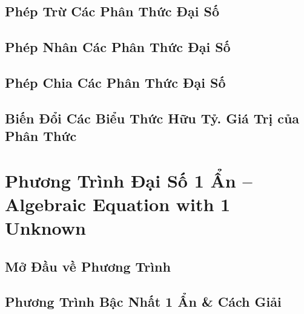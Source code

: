 \documentclass{article}
\numberwithin{equation}{section}
\begin{document}

\subsection{Phép Trừ Các Phân Thức Đại Số}


\subsection{Phép Nhân Các Phân Thức Đại Số}


\subsection{Phép Chia Các Phân Thức Đại Số}


\subsection{Biến Đổi Các Biểu Thức Hữu Tỷ. Giá Trị của Phân Thức}


\section{Phương Trình Đại Số 1 Ẩn -- Algebraic Equation with 1 Unknown}

\subsection{Mở Đầu về Phương Trình}


\subsection{Phương Trình Bậc Nhất 1 Ẩn \& Cách Giải}

\end{document}
